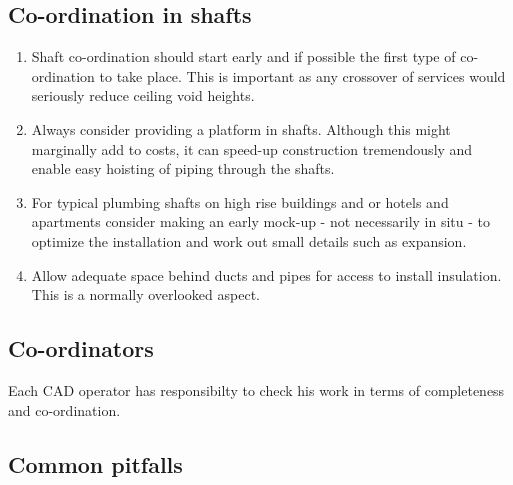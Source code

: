 \subsection*{Co-ordination in shafts}

\begin{enumerate}
\item Shaft co-ordination should start early and if possible the first type of co-ordination to take place. This is important as any crossover of services
would seriously reduce ceiling void heights.
\item Always consider providing a platform in shafts. Although this might marginally add to costs, it can speed-up construction tremendously and enable
easy hoisting of piping through the shafts.
\item For typical plumbing shafts on high rise buildings and or hotels and
apartments consider making an early mock-up - not necessarily in situ - to 
optimize the installation and work out small details such as expansion.
\item Allow adequate space behind ducts and pipes for access to install insulation. This is a normally overlooked aspect.
\end{enumerate}


\subsection*{Co-ordinators}
Each CAD operator has responsibilty to check his work in terms of
completeness and co-ordination.

\subsection*{Common pitfalls}

